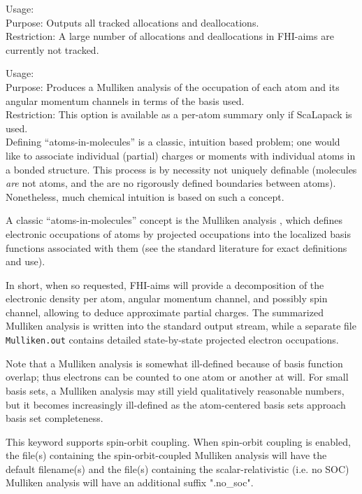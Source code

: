 {
  \noindent
  Usage:   \\[1.0ex]
  Purpose: Outputs all tracked allocations and deallocations. \\[1.0ex]
  Restriction: A large number of allocations and deallocations in FHI-aims are
    currently not tracked. \\[1.0ex]
}


{
  \noindent
  Usage:   \\[1.0ex]
  Purpose: Produces a Mulliken analysis of the occupation of each atom
    and its angular momentum channels in terms of the basis
  used. \\[1.0ex]
  Restriction: This option is available as a per-atom summary only if
    ScaLapack is used. \\[1.0ex]
}
Defining ``atoms-in-molecules'' is a classic, intuition based problem;
one would like to associate individual (partial) charges or moments
with individual atoms in a bonded structure. This process is by
necessity not uniquely definable (molecules \emph{are} not atoms, and
the are no rigorously defined boundaries between atoms). Nonetheless,
much chemical intuition is based on such a concept.

A classic ``atoms-in-molecules'' concept is the Mulliken analysis
\cite{Mulliken55}, which defines electronic occupations of atoms by
projected occupations into the localized basis functions associated
with them (see the standard literature for exact definitions and use).

In short, when so requested, FHI-aims will provide a decomposition of
the electronic density per atom, angular momentum channel, and
possibly spin channel, allowing to deduce approximate partial
charges. The summarized Mulliken analysis is written into the standard
output stream, while a separate file \texttt{Mulliken.out} contains
detailed state-by-state projected electron occupations.

Note that a Mulliken analysis is somewhat ill-defined because of basis
function overlap; thus electrons can be counted to one atom or another
at will. For small basis sets, a Mulliken analysis may still yield
qualitatively reasonable numbers, but it becomes increasingly
ill-defined as the atom-centered basis sets approach basis set
completeness.

This keyword supports spin-orbit coupling.  When spin-orbit coupling is
enabled, the file(s) containing the spin-orbit-coupled Mulliken analysis
will have the default filename(s) and the file(s) containing the
scalar-relativistic (i.e. no SOC) Mulliken analysis will have an additional
suffix ".no\_soc".

